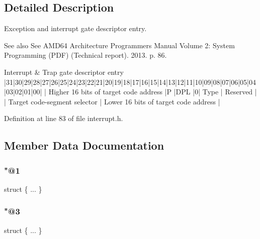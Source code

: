 \subsection{Detailed Description}
Exception and interrupt gate descriptor entry. 

\begin{DoxySeeAlso}{See also}
See A\+M\+D64 Architecture Programmer\textquotesingle{}s Manual Volume 2\+: System Programming (P\+DF) (Technical report). 2013. p. 86.
\end{DoxySeeAlso}
\begin{DoxyVerb}Interrupt & Trap gate descriptor entry
|31|30|29|28|27|26|25|24|23|22|21|20|19|18|17|16|15|14|13|12|11|10|09|08|07|06|05|04|03|02|01|00|
| Higher 16 bits of target code address         |P |DPL  |0|    Type    | Reserved              |
| Target code-segment selector                  | Lower 16 bits of target code address          |
\end{DoxyVerb}
 

Definition at line 83 of file interrupt.\+h.



\subsection{Member Data Documentation}
\mbox{\label{union_i_n_t_r_p_1_1_descriptor_entry_aca00412988ec1cd09124f03da2bb1f62}} 
\subsubsection{\texorpdfstring{"@1}{@1}}
{\footnotesize\ttfamily struct \{ ... \} }

\mbox{\label{union_i_n_t_r_p_1_1_descriptor_entry_a2aee92276b93731d9ccafa7eb16c9c2e}} 
\subsubsection{\texorpdfstring{"@3}{@3}}
{\footnotesize\ttfamily struct \{ ... \} }

\mbox{\label{union_i_n_t_r_p_1_1_descriptor_entry_a479e62ef6f3e27e03e121d965d6bab99}} 

